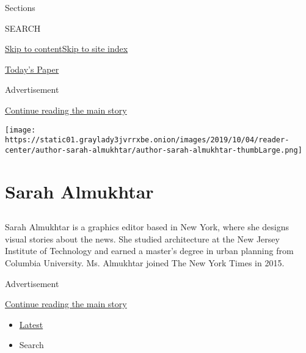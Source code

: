 Sections

SEARCH

\protect\hyperlink{site-content}{Skip to
content}\protect\hyperlink{site-index}{Skip to site index}

\href{https://myaccount.nytimes3xbfgragh.onion/auth/login?response_type=cookie\&client_id=vi}{}

\href{https://www.nytimes3xbfgragh.onion/section/todayspaper}{Today's
Paper}

Advertisement

\protect\hyperlink{after-top}{Continue reading the main story}

\texttt{[image: https://static01.graylady3jvrrxbe.onion/images/2019/10/04/reader-center/author-sarah-almukhtar/author-sarah-almukhtar-thumbLarge.png]}

\hypertarget{sarah-almukhtar}{%
\section{Sarah Almukhtar}\label{sarah-almukhtar}}

\hypertarget{section}{%
\subsection{}\label{section}}

Sarah Almukhtar is a graphics editor based in New York, where she
designs visual stories about the news. She studied architecture at the
New Jersey Institute of Technology and earned a master's degree in urban
planning from Columbia University. Ms. Almukhtar joined The New York
Times in 2015.

Advertisement

\protect\hyperlink{after-mid1}{Continue reading the main story}

\begin{itemize}
\tightlist
\item
  \protect\hyperlink{stream-panel}{Latest}
\item
  Search
\end{itemize}

